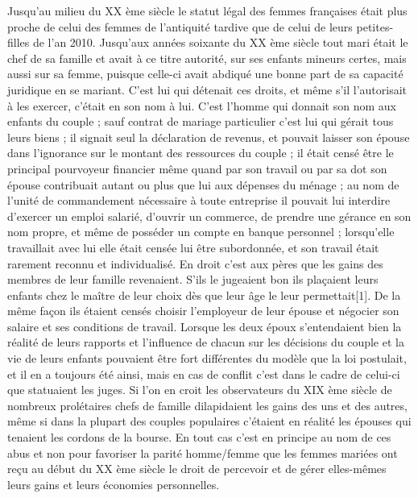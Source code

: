  Jusqu'au milieu du XX ème siècle le statut légal des femmes françaises était plus proche de celui des femmes de l'antiquité tardive que de celui de leurs petites-filles de l'an 2010. Jusqu'aux années soixante du XX ème siècle tout mari était le chef de sa famille et avait à ce titre autorité, sur ses enfants mineurs certes, mais aussi sur sa femme, puisque celle-ci avait abdiqué une bonne part de sa capacité juridique en se mariant. C'est lui qui détenait ces droits, et même s'il l'autorisait à les exercer, c'était en son nom à lui. C'est l'homme qui donnait son nom aux enfants du couple ; sauf contrat de mariage particulier c'est lui qui gérait tous leurs biens ; il signait seul la déclaration de revenus, et pouvait laisser son épouse dans l'ignorance sur le montant des ressources du couple ; il était censé être le principal pourvoyeur financier même quand par son travail ou par sa dot son épouse contribuait autant ou plus que lui aux dépenses du ménage ; au nom de l'unité de commandement nécessaire à toute entreprise il pouvait lui interdire d'exercer un emploi salarié, d'ouvrir un commerce, de prendre une gérance en son nom propre, et même de posséder un compte en banque personnel ; lorsqu'elle travaillait avec lui elle était censée lui être subordonnée, et son travail était rarement reconnu et individualisé. En droit c'est aux pères que les gains des membres de leur famille revenaient. S'ils le jugeaient bon ils plaçaient leurs enfants chez le maître de leur choix dès que leur âge le leur permettait[1]. De la même façon ils étaient censés choisir l'employeur de leur épouse et négocier son salaire et ses conditions de travail. 
 Lorsque les deux époux s'entendaient bien la réalité de leurs rapports et l'influence de chacun sur les décisions du couple et la vie de leurs enfants pouvaient être fort différentes du modèle que la loi postulait, et il en a toujours été ainsi, mais en cas de conflit c'est dans le cadre de celui-ci que statuaient les juges.
 Si l'on en croit les observateurs du XIX ème siècle de nombreux prolétaires chefs de famille dilapidaient les gains des uns et des autres, même si dans la plupart des couples populaires c'étaient en réalité les épouses qui tenaient les cordons de la bourse. En tout cas c'est en principe au nom de ces abus et non pour favoriser la parité homme/femme que les femmes mariées ont reçu au début du XX ème siècle le droit de percevoir et de gérer elles-mêmes leurs gains et leurs économies personnelles.
